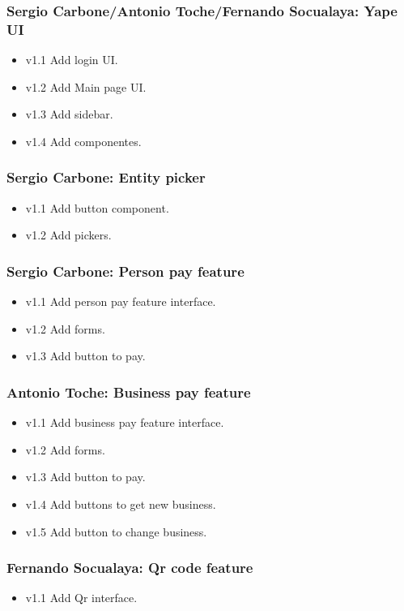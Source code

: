 \documentclass{article}
\begin{document}
\subsubsection{Sergio Carbone/Antonio Toche/Fernando Socualaya: Yape UI}
\begin{itemize}
\item v1.1 Add login UI.
\item v1.2 Add Main page UI.
\item v1.3 Add sidebar.
\item v1.4 Add componentes.
\end{itemize}

\subsubsection{Sergio Carbone: Entity picker}
\begin{itemize}
\item v1.1 Add button component.
\item v1.2 Add pickers.
\end{itemize}

\subsubsection{Sergio Carbone: Person pay feature}
\begin{itemize}
\item v1.1 Add person pay feature interface.
\item v1.2 Add forms.
\item v1.3 Add button to pay.
\end{itemize}

\subsubsection{Antonio Toche: Business pay feature}
\begin{itemize}
\item v1.1 Add business pay feature interface.
\item v1.2 Add forms.
\item v1.3 Add button to pay.
\item v1.4 Add buttons to get new business.
\item v1.5 Add button to change business.
\end{itemize}

\subsubsection{Fernando Socualaya: Qr code feature}
\begin{itemize}
\item v1.1 Add Qr interface.
\end{itemize}
\end{document}

